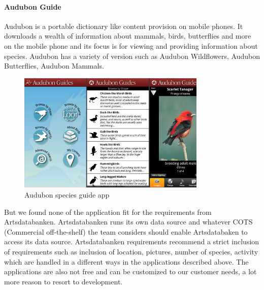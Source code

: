 \paragraph{Audubon Guide}
Audubon is a portable dictionary like content provision on mobile phones. It
downloads a wealth of information about mammals, birds, butterflies and more on
the mobile phone and its focus is for viewing and providing information about
species\cite{similarproduct:audubon}. Audubon has a variety of version such as
Audubon Wildflowers, Audubon Butterflies, Audubon Mammals.

\begin{figure}[htb]
    \centering
    \includegraphics[width=0.8\textwidth]{introduction/project_description/audubonguide.png}
    \caption{Audubon species guide app}
    \label{fig:audubonapp}
\end{figure}

But we found none of the application fit for the requirements from
Artsdatabanken. Artsdatabanken runs its own data source and whatever COTS
(Commercial off-the-shelf) the team considers should enable Artsdatabaken to
access its data source. Artsdatabanken requirements recommend a strict inclusion
of requirements such as inclusion of location, pictures, number of species,
activity which are handled in a different ways in the applications described
above. The applications are also not free and  can be customized to our customer
needs, a lot more reason to resort to development.
